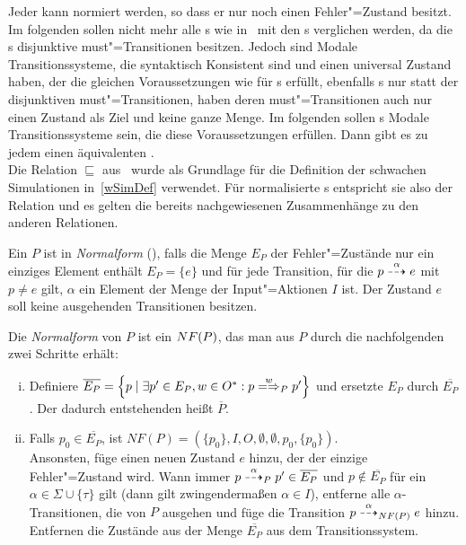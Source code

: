 Jeder \MEIO{} kann normiert werden, so dass er nur noch einen Fehler"=Zustand
besitzt. Im folgenden sollen nicht mehr alle \MIA{}s wie
in~\cite{Vogler2016MIA3} mit den \MEIO{}s verglichen werden, da die \MIA{}s
disjunktive must"=Transitionen besitzen. Jedoch sind Modale Transitionssysteme,
die syntaktisch Konsistent sind und einen universal Zustand haben, der die
gleichen Voraussetzungen wie für \MIA{}s erfüllt, ebenfalls \MIA{}s nur statt
der disjunktiven must"=Transitionen, haben deren must"=Transitionen auch nur
einen Zustand als Ziel und keine ganze Menge. Im folgenden sollen \MIA{}s
Modale Transitionssysteme sein, die diese Voraussetzungen erfüllen. Dann gibt
es zu jedem \MEIO{} einen äquivalenten \MIA{}.\\
Die Relation $\sqsubseteq$ aus~\cite{Vogler2016MIA3} wurde als Grundlage für
die Definition der schwachen Simulationen in~\ref{wSimDef} verwendet. Für
normalisierte \MEIO{}s entspricht sie also der Relation \wasRel{} und es gelten
die bereits nachgewiesenen Zusammenhänge zu den anderen Relationen.

\begin{Def}[Normalform]
  \label{NFDef}
  Ein \MEIO{} $P$ ist in \emph{Normalform} (\NF{}), falls die Menge $E_P$ der
  Fehler"=Zustände nur ein einziges Element enthält $E_P=\{e\}$ und für jede
  Transition, für die $p \may[\alpha] e$ mit $p\neq e$ gilt, $\alpha$ ein
  Element der Menge der Input"=Aktionen $I$ ist. Der Zustand $e$ soll keine
  ausgehenden Transitionen besitzen.

  Die \emph{Normalform} von $P$ ist ein \MEIO{} $NF (P)$, das man aus $P$
  durch die nachfolgenden zwei Schritte erhält:
  \begin{enumerate}[(i)]
    \item Definiere $\overline{E_P} = \left\{p \mid \exists p'\in E_P, w\in
      O^*: p\weakmay[w]_P p'\right\}$ und ersetzte $E_P$ durch
      $\overline{E_P}$. Der dadurch entstehenden \MEIO{} heißt $\overline{P}$.
    \item Falls $p_0\in \overline{E_P}$, ist $NF(P) = \left(\{p_0\}, I, O,
      \emptyset , \emptyset , p_0, \{p_0\}\right)$.\\
      Ansonsten, füge einen neuen Zustand $e$ hinzu, der der einzige
      Fehler"=Zustand wird. Wann immer $p \may[\alpha]_P p'\in \overline{E_P}$
      und $p\notin \overline{E_P}$ für ein $\alpha\in \Sigma \cup \{\tau\}$
      gilt (dann gilt zwingendermaßen $\alpha \in I$), entferne alle
      $\alpha$-Transitionen, die von $P$ ausgehen und füge die Transition
      $p\may[\alpha]_{\NF (P)} e$ hinzu. Entfernen die Zustände aus der Menge
      $\overline{E_P}$ aus dem Transitionssystem.
  \end{enumerate}
\end{Def}

